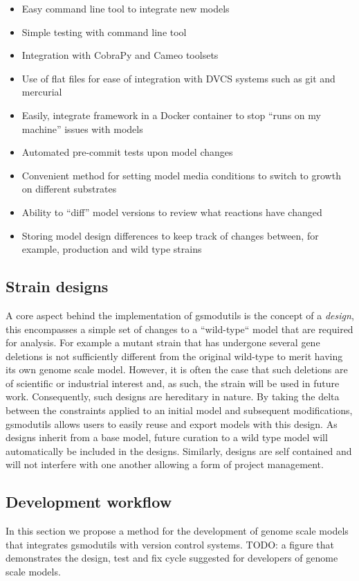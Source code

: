\documentclass{bioinfo}
\begin{document}
\begin{itemize}
 \item Easy command line tool to integrate new models
 \item Simple testing with command line tool
 \item Integration with CobraPy and Cameo toolsets
 \item Use of flat files for ease of integration with DVCS systems such as git and mercurial
 \item Easily, integrate framework in a Docker container to stop ``runs on my machine'' issues with models
 \item Automated pre-commit tests upon model changes
 \item Convenient method for setting model media conditions to switch to growth on different substrates
 \item Ability to ``diff'' model versions to review what reactions have changed
 \item Storing model design differences to keep track of changes between, for example, production and wild type strains
\end{itemize}



\subsection{Strain designs}
A core aspect behind the implementation of gsmodutils is the concept of a \textit{design}, this encompasses a simple set of changes to a ``wild-type`` model that are required for analysis.
For example a mutant strain that has undergone several gene deletions is not sufficiently different from the original wild-type to merit having its own genome scale model.
However, it is often the case that such deletions are of scientific or industrial interest and, as such, the strain will be used in future work.
Consequently, such designs are hereditary in nature.
By taking the delta between the constraints applied to an initial model and subsequent modifications, gsmodutils allows users to easily reuse and export models with this design.
As designs inherit from a base model, future curation to a wild type model will automatically be included in the designs.
Similarly, designs are self contained and will not interfere with one another allowing a form of project management.

\subsection{Development workflow}
In this section we propose a method for the development of genome scale models that integrates gsmodutils with version control systems.
TODO: a figure that demonstrates the design, test and fix cycle suggested for developers of genome scale models.
\end{document}
